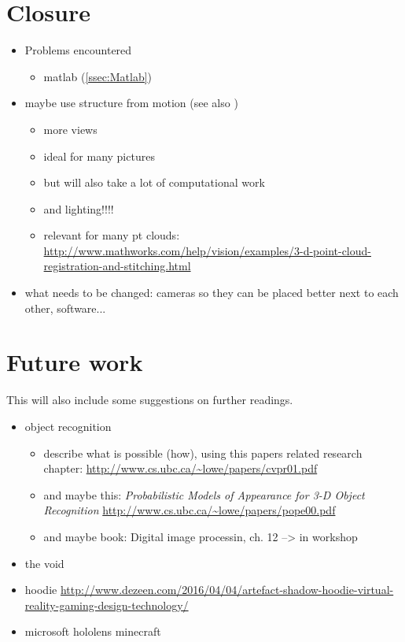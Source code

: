\section{Closure}
\begin{itemize}
\item Problems encountered
	\begin{itemize}
	\item matlab (\autoref{ssec:Matlab})
	\end{itemize}
\item maybe use structure from motion (see also \cite{Gordon.2004})
	\begin{itemize}
	\item more views
	\item ideal for many pictures
	\item but will also take a lot of computational work
	\item and lighting!!!!
	\item relevant for many pt clouds: \url{http://www.mathworks.com/help/vision/examples/3-d-point-cloud-registration-and-stitching.html}
	\end{itemize}
\item what needs to be changed: cameras so they can be placed better next to each other, software...

\end{itemize}


\section{Future work}\label{sec:Future}
This will also include some suggestions on further readings.

\begin{itemize}
\item object recognition
	\begin{itemize}
	\item describe what is possible (how), using this papers related research chapter: \cite{Lowe.2001} \url{http://www.cs.ubc.ca/~lowe/papers/cvpr01.pdf}
	\item and maybe this: \textit{Probabilistic Models of Appearance for 3-D Object Recognition}  \url{http://www.cs.ubc.ca/~lowe/papers/pope00.pdf}
	\item and maybe book: Digital image processin, ch. 12 --> in workshop
	\end{itemize}
\item the void
\item hoodie \url{http://www.dezeen.com/2016/04/04/artefact-shadow-hoodie-virtual-reality-gaming-design-technology/}
\item microsoft hololens minecraft
	
\end{itemize}
